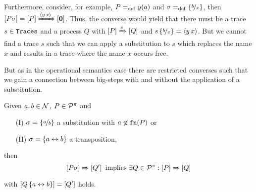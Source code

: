 Furthermore, consider, for example, $P=_{\mathrm{def}}y(a)$ and $\sigma=_{\mathrm{def}}\left\{\nicefrac{b}{x}\right\}$, then $\left[P\sigma\right]=\left[P\right]\xRightarrow{\langle y\,x\rangle}\left[\mathbf{0}\right]$. Thus, the converse would yield that there must be a trace $s\in\mathtt{Traces}$ and a process $Q$ with $\left[P\right]\xRightarrow{s}\left[Q\right]$ and $s\left\{\nicefrac{b}{x}\right\}=\langle y\,x\rangle$. But we cannot find a trace $s$ such that we can apply a substitution to $s$ which replaces the name $x$ and results in a trace where the name $x$ occurs free.

But as in the operational semantics case there are restricted converses such that we gain a connection between big-steps with and without the application of a substitution.

\begin{lemma}
\label{lem_subst_bigstep_partIII}
Given $a,b\in\mathcal N$, $P\in\mathcal P^{\pi}$ and 
\begin{itemize}
\item[(I)] $\sigma=\left\{\nicefrac{a}{b}\right\}$ a substitution with $a\not\in\mathtt{fn}(P)$ or
\item[(II)] $\sigma=\left\{a\leftrightarrow{}b\right\}$ a transposition,
\end{itemize} then
\[\left[P\sigma\right]\xRightarrow{}\left[Q'\right] \text{ implies } \exists Q\in\mathcal P^{\pi}:\left[P\right]\xRightarrow{}\left[Q\right]\]
with $\left[Q\left\{a\leftrightarrow{}b\right\}\right]=\left[Q'\right]$ holds.
\end{lemma}
